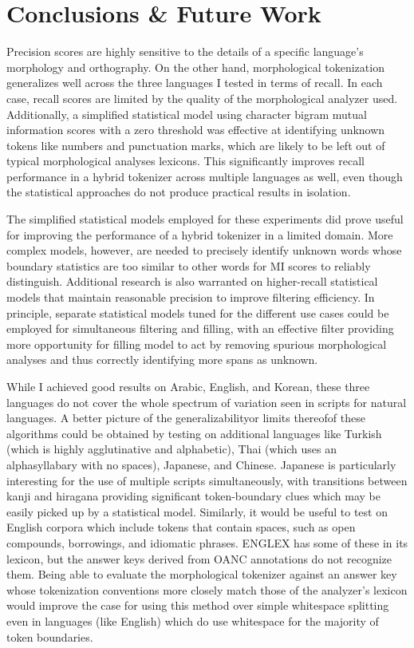 \chapter{Conclusions \& Future Work}

Precision scores are highly sensitive to the details of a specific language's morphology and orthography. On the other hand, morphological tokenization generalizes well across the three languages I tested in terms of recall. In each case, recall scores are limited by the quality of the morphological analyzer used. Additionally, a simplified statistical model using character bigram mutual information scores with a zero threshold was effective at identifying unknown tokens like numbers and punctuation marks, which are likely to be left out of typical morphological analyses lexicons. This significantly improves recall performance in a hybrid tokenizer across multiple languages as well, even though the statistical approaches do not produce practical results in isolation.

The simplified statistical models employed for these experiments did prove useful for improving the performance of a hybrid tokenizer in a limited domain. More complex models, however, are needed to precisely identify unknown words whose boundary statistics are too similar to other words for MI scores to reliably distinguish. Additional research is also warranted on higher-recall statistical models that maintain reasonable precision to improve filtering efficiency. In principle, separate statistical models tuned for the different use cases could be employed for simultaneous filtering and filling, with an effective filter providing more opportunity for filling model to act by removing spurious morphological analyses and thus correctly identifying more spans as unknown.

While I achieved good results on Arabic, English, and Korean, these three languages do not cover the whole spectrum of variation seen in scripts for natural languages. A better picture of the generalizability\textemdash or limits thereof\textemdash of these algorithms could be obtained by testing on additional languages like Turkish (which is highly agglutinative and alphabetic), Thai (which uses an alphasyllabary with no spaces), Japanese, and Chinese.
Japanese is particularly interesting for the use of multiple scripts simultaneously, with transitions between kanji and hiragana providing significant token-boundary clues which may be easily picked up by a statistical model. Similarly, it would be useful to test on English corpora which include tokens that contain spaces, such as open compounds, borrowings, and idiomatic phrases. ENGLEX has some of these in its lexicon, but the answer keys derived from OANC annotations do not recognize them. Being able to evaluate the morphological tokenizer against an answer key whose tokenization conventions more closely match those of the analyzer's lexicon would improve the case for using this method over simple whitespace splitting even in languages (like English) which do use whitespace for the majority of token boundaries.

